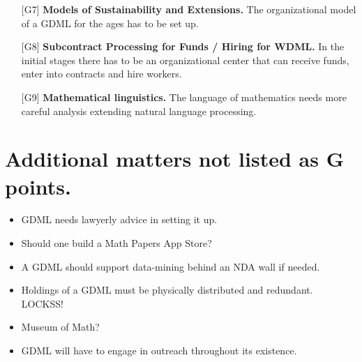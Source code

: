 \documentclass{article}
\begin{document}
\begin{itemize}
\item[{[}G7{]}] \textbf{Models of Sustainability and Extensions.}
The organizational model of a GDML for the ages has to be set up.

\item[{[}G8{]}] \textbf{Subcontract Processing for Funds / Hiring for WDML.}
In the initial stages there has to be an organizational center
that can receive funds, enter into contracts and hire workers.

\item[{[}G9{]}] \textbf{Mathematical linguistics.}
The language of mathematics needs more careful analysis extending
natural language processing.
\end{itemize}

\section{Additional matters not listed as G points.}

\begin{itemize}
\item GDML needs lawyerly advice in setting it up.
\item Should one build a Math Papers App Store?
\item A GDML should support data-mining behind an NDA wall if needed.
\item Holdings of a GDML must be physically distributed and redundant.
  LOCKSS!
\item Museum of Math?
\item GDML will have to engage in outreach throughout its existence.
\end{itemize}
\end{document}

